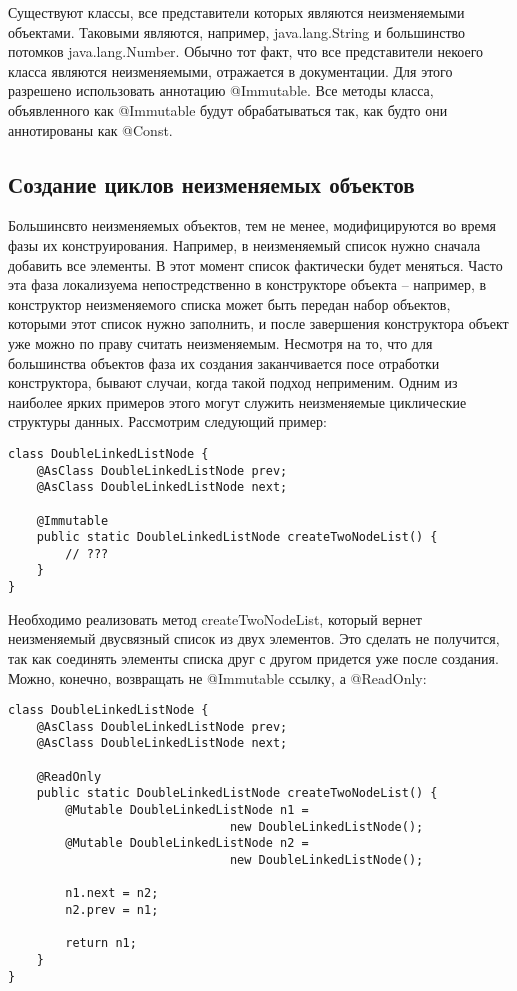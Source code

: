Существуют классы, все представители которых являются неизменяемыми объектами. Таковыми являются, например, java.lang.String и большинство потомков java.lang.Number. Обычно тот факт, что все представители некоего класса являются неизменяемыми, отражается в документации. Для этого разрешено использовать аннотацию @Immutable. Все методы класса, объявленного как @Immutable будут обрабатываться так, как будто они аннотированы как @Const.

\subsection{Создание циклов неизменяемых объектов}

Большинсвто неизменяемых объектов, тем не менее, модифицируются во время фазы их конструирования. Например, в неизменяемый список нужно сначала добавить все элементы. В этот момент список фактически будет меняться. Часто эта фаза локализуема непостредственно в конструкторе объекта -- например, в конструктор неизменяемого списка может быть передан набор объектов, которыми этот список нужно заполнить, и после завершения конструктора объект уже можно по праву считать неизменяемым. Несмотря на то, что для большинства объектов фаза их создания заканчивается посе отработки конструктора, бывают случаи, когда такой подход неприменим. Одним из наиболее ярких примеров этого могут служить неизменяемые циклические структуры данных. Рассмотрим следующий пример:

\begin{lstlisting}[caption=DoubleLinkedListNode.java, label=code:circular_list_node]
class DoubleLinkedListNode {
    @AsClass DoubleLinkedListNode prev;
    @AsClass DoubleLinkedListNode next;
    
    @Immutable
    public static DoubleLinkedListNode createTwoNodeList() {
    	// ???
    }
}
\end{lstlisting} 

Необходимо реализовать метод createTwoNodeList, который вернет неизменяемый двусвязный список из двух элементов. Это сделать не получится, так как соединять элементы списка друг с другом придется уже после создания. Можно, конечно, возвращать не @Immutable ссылку, а @ReadOnly:
 
\begin{lstlisting}[caption=DoubleLinkedListNode.java, label=code:circular_list_node_ro]
class DoubleLinkedListNode {
    @AsClass DoubleLinkedListNode prev;
    @AsClass DoubleLinkedListNode next;
    
    @ReadOnly
    public static DoubleLinkedListNode createTwoNodeList() {
    	@Mutable DoubleLinkedListNode n1 = 
                               new DoubleLinkedListNode();
        @Mutable DoubleLinkedListNode n2 = 
                               new DoubleLinkedListNode();
    	
        n1.next = n2;
        n2.prev = n1;
    
        return n1;  
    }
}
\end{lstlisting} 

